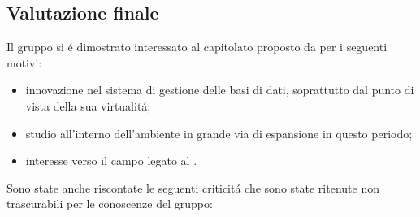 \subsection{Valutazione finale}
Il gruppo si \'e dimostrato interessato al capitolato proposto da \Proponente{} per i seguenti motivi:
\begin{itemize}
	\item innovazione nel sistema di gestione delle basi di dati, soprattutto dal punto di vista della sua virtualit\'a;
	\item studio all'interno dell'ambiente  in grande via di espansione in questo periodo;
	\item interesse verso il campo legato al .
\end{itemize}
Sono state anche riscontate le seguenti criticit\'a che sono state ritenute non trascurabili per le conoscenze del gruppo:
\begin{itemize}
	
\end{itemize}
